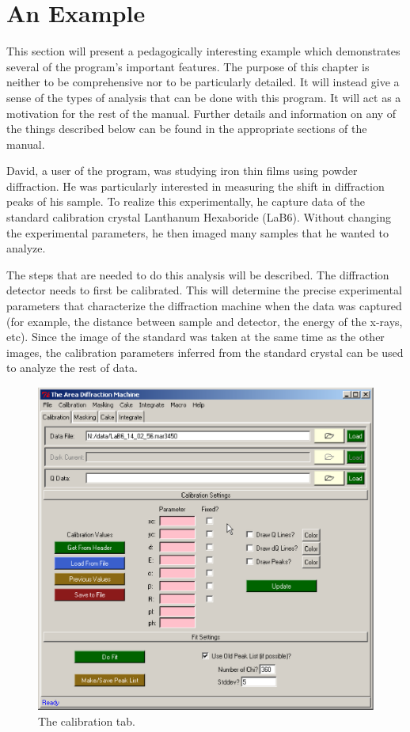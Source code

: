 \chapter{An Example}
This section will present a pedagogically interesting 
example which demonstrates several of the program's important
features.  The purpose of this chapter is neither to be 
comprehensive nor to be particularly detailed. It will instead 
give a sense of the types of analysis that can be done with 
this program. It will act as a motivation for the rest of the manual. 
Further details 
and information on any of the things described below can be found in 
the appropriate sections of the manual.

David, a user of the program, was studying iron thin films 
using powder diffraction. He was particularly interested in 
measuring the shift in diffraction peaks of his sample. To 
realize this experimentally, he capture data of the 
standard calibration crystal Lanthanum Hexaboride (LaB6). 
Without changing the experimental parameters, he then imaged 
many samples that he wanted to analyze. 

The steps that are needed to do this analysis will be
described. The diffraction detector needs to first be calibrated.
This will determine the precise experimental parameters that 
characterize the diffraction machine when the data was captured
(for example, the distance between sample and detector, the energy 
of the x-rays, etc). Since the image of the standard was taken at the same
time as the other images, the calibration parameters inferred
from the standard crystal can be used to analyze the
rest of data.

\begin{figure}
    \centering
    \includegraphics[scale=.75]
    {figures/calibration_tab.eps}
    \caption{The calibration tab.}
    \label{calibration_tab_example}
\end{figure}

